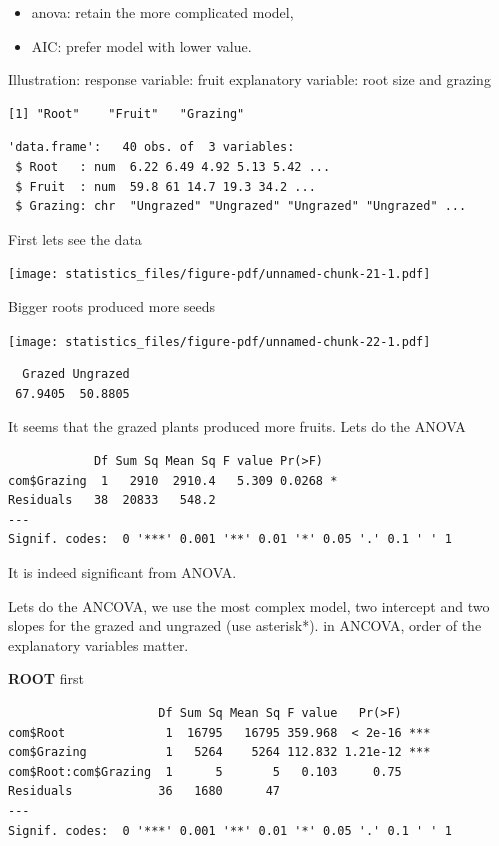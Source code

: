 \documentclass[
  letterpaper,
  DIV=11,
  numbers=noendperiod]{scrreprt}
\providecommand{\tightlist}{%
  \setlength{\itemsep}{0pt}\setlength{\parskip}{0pt}}\usepackage{longtable,booktabs,array}
\begin{document}
\begin{itemize}
\tightlist
\item
  anova: retain the more complicated model,
\item
  AIC: prefer model with lower value.
\end{itemize}

Illustration: response variable: fruit explanatory variable: root size
and grazing

\begin{verbatim}
[1] "Root"    "Fruit"   "Grazing"
\end{verbatim}

\begin{verbatim}
'data.frame':   40 obs. of  3 variables:
 $ Root   : num  6.22 6.49 4.92 5.13 5.42 ...
 $ Fruit  : num  59.8 61 14.7 19.3 34.2 ...
 $ Grazing: chr  "Ungrazed" "Ungrazed" "Ungrazed" "Ungrazed" ...
\end{verbatim}

First lets see the data

\texttt{[image: statistics\_files/figure-pdf/unnamed-chunk-21-1.pdf]}

Bigger roots produced more seeds

\texttt{[image: statistics\_files/figure-pdf/unnamed-chunk-22-1.pdf]}

\begin{verbatim}
  Grazed Ungrazed 
 67.9405  50.8805 
\end{verbatim}

It seems that the grazed plants produced more fruits. Lets do the ANOVA

\begin{verbatim}
            Df Sum Sq Mean Sq F value Pr(>F)  
com$Grazing  1   2910  2910.4   5.309 0.0268 *
Residuals   38  20833   548.2                 
---
Signif. codes:  0 '***' 0.001 '**' 0.01 '*' 0.05 '.' 0.1 ' ' 1
\end{verbatim}

It is indeed significant from ANOVA.

Lets do the ANCOVA, we use the most complex model, two intercept and two
slopes for the grazed and ungrazed (use asterisk*). in ANCOVA, order of
the explanatory variables matter.

\textbf{ROOT} first

\begin{verbatim}
                     Df Sum Sq Mean Sq F value   Pr(>F)    
com$Root              1  16795   16795 359.968  < 2e-16 ***
com$Grazing           1   5264    5264 112.832 1.21e-12 ***
com$Root:com$Grazing  1      5       5   0.103     0.75    
Residuals            36   1680      47                     
---
Signif. codes:  0 '***' 0.001 '**' 0.01 '*' 0.05 '.' 0.1 ' ' 1
\end{verbatim}
\end{document}
